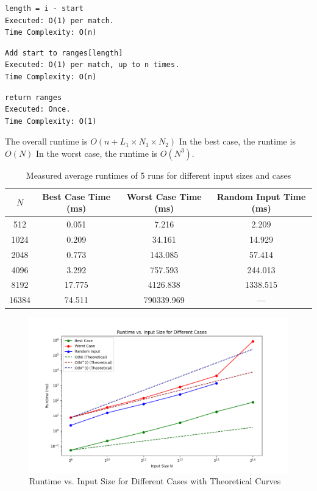 \documentclass[12 pt]{article}
\begin{document}
\begin{verbatim}
length = i - start
Executed: O(1) per match.
Time Complexity: O(n)
\end{verbatim}

\begin{verbatim}
Add start to ranges[length]
Executed: O(1) per match, up to n times.
Time Complexity: O(n)
\end{verbatim}

\begin{verbatim}
return ranges
Executed: Once.
Time Complexity: O(1)
\end{verbatim}

The overall runtime is $O(n + L_1 \times N_1 \times N_2)$
In the best case, the runtime is $O(N)$
In the worst case, the runtime is $O(N^3)$.

\begin{table}[h!]
\centering
\begin{tabular}{|c|c|c|c|}
\hline
$N$ & Best Case Time (ms) & Worst Case Time (ms) & Random Input Time (ms) \\
\hline
512   & 0.051    & 7.216      & 2.209     \\
\hline
1024  & 0.209    & 34.161     & 14.929    \\
\hline
2048  & 0.773    & 143.085    & 57.414    \\
\hline
4096  & 3.292    & 757.593    & 244.013   \\
\hline
8192  & 17.775   & 4126.838   & 1338.515  \\
\hline
16384 & 74.511   & 790339.969 & ---       \\
\hline
\end{tabular}
\caption{Measured average runtimes of 5 runs for different input sizes and cases}
\label{tab:runtime_data}
\end{table}

\begin{figure}[h!]
  \centering
  \includegraphics[width=\textwidth]{Q5.png}
  \caption{Runtime vs. Input Size for Different Cases with Theoretical Curves}
  \label{fig:runtime_plot}
\end{figure}
\end{document}
